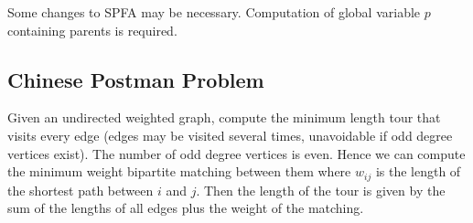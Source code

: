 Some changes to SPFA may be necessary. Computation of global variable $p$ containing parents is required.

\subsection{Chinese Postman Problem}

Given an undirected weighted graph, compute the minimum length tour that visits every edge (edges may be visited several times, unavoidable if odd degree vertices exist). The number of odd degree vertices is even. Hence we can compute the minimum weight bipartite matching between them where $w_{ij}$ is the length of the shortest path between $i$ and $j$. Then the length of the tour is given by the sum of the lengths of all edges plus the weight of the matching.
